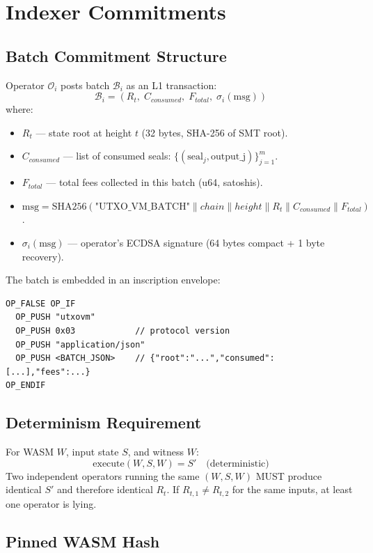 \documentclass[a4paper,11pt]{article}
\begin{document}
\section{Indexer Commitments}

\subsection{Batch Commitment Structure}

Operator $\mathcal{O}_i$ posts batch $\mathcal{B}_i$ as an L1 transaction:
\[
    \mathcal{B}_i = (R_t,\; C_{consumed},\; F_{total},\; \sigma_i(\text{msg}))
\]
where:
\begin{itemize}[nosep]
    \item $R_t$ --- state root at height $t$ (32 bytes, SHA-256 of SMT root).
    \item $C_{consumed}$ --- list of consumed seals: $\{(\text{seal}_j, \text{output\_j})\}_{j=1}^{m}$.
    \item $F_{total}$ --- total fees collected in this batch (u64, satoshis).
    \item $\text{msg} = \text{SHA256}(\text{"UTXO\_VM\_BATCH"} \| chain \| height \| R_t \| C_{consumed} \| F_{total})$.
    \item $\sigma_i(\text{msg})$ --- operator's ECDSA signature (64 bytes compact + 1 byte recovery).
\end{itemize}

The batch is embedded in an inscription envelope:
\begin{lstlisting}[style=script]
OP_FALSE OP_IF
  OP_PUSH "utxovm"
  OP_PUSH 0x03            // protocol version
  OP_PUSH "application/json"
  OP_PUSH <BATCH_JSON>    // {"root":"...","consumed":[...],"fees":...}
OP_ENDIF
\end{lstlisting}

\subsection{Determinism Requirement}

For WASM $W$, input state $S$, and witness $W$:
\[
    \text{execute}(W, S, W) = S' \quad \text{(deterministic)}
\]
Two independent operators running the same $(W, S, W)$ MUST produce identical $S'$ and therefore identical $R_t$. If $R_{t,1} \neq R_{t,2}$ for the same inputs, at least one operator is lying.

\subsection{Pinned WASM Hash}
\end{document}
